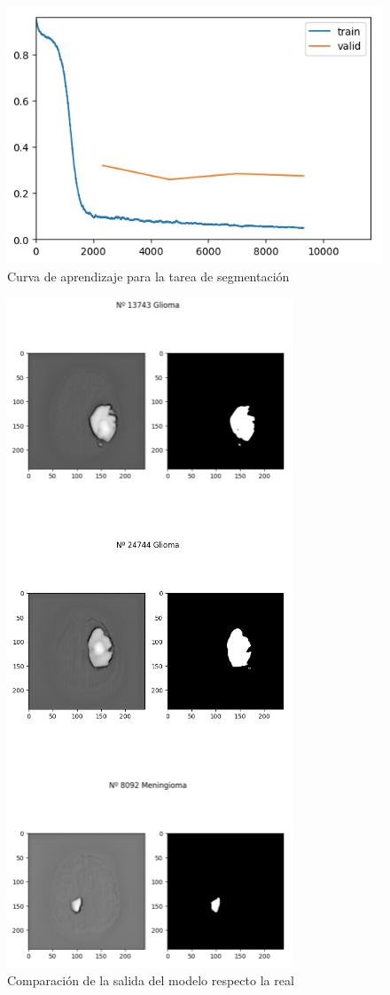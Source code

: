 \begin{figure}[H]
	\centering
	\includegraphics[width=0.7\linewidth]{imagenes/curva_segmentation.png}
	\caption{Curva de aprendizaje para la tarea de segmentación}
\end{figure}

\begin{figure}[H]
	\centering
	\includegraphics[width=0.5\linewidth]{imagenes/output_segmentation.png}
	\caption{Comparación de la salida del modelo respecto la real}
\end{figure}

